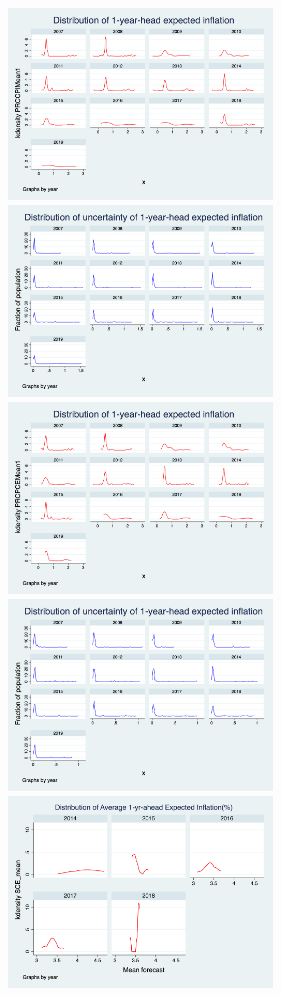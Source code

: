 \documentclass[]{article}
\begin{document}
\begin{figure}[ht]
	\centering
	\includegraphics[width=7cm]{figures/PRCCPIMean1_hist.png} 
	\includegraphics[width=7cm]{figures/PRCCPIVar1_hist.png}  \\
	\smallskip
		\includegraphics[width=7cm]{figures/PRCPCEMean1_hist.png} 
	\includegraphics[width=7cm]{figures/PRCPCEVar1_hist.png}  \\
	\smallskip
		\includegraphics[width=7cm]{figures/SCEmean_hist.png} 

\end{figure}
\end{document}
